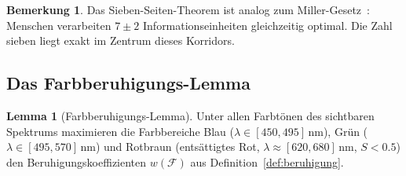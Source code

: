 ﻿\documentclass[a4paper,12pt]{article}
\theoremstyle{definition}
\newtheorem{lemma}{Lemma}
\newtheorem{bemerkung}{Bemerkung}
\begin{document}
\begin{bemerkung}
    Das Sieben-Seiten-Theorem ist analog zum Miller-Gesetz~\cite{miller1956}:
    Menschen verarbeiten $7 \pm 2$ Informationseinheiten gleichzeitig optimal.
    Die Zahl sieben liegt exakt im Zentrum dieses Korridors.
\end{bemerkung}

\subsection{Das Farbberuhigungs-Lemma}

\begin{lemma}[Farbberuhigungs-Lemma]
\label{lem:farbe}
    Unter allen Farbtönen des sichtbaren Spektrums maximieren die Farbbereiche
    Blau ($\lambda \in [450, 495]\,\text{nm}$), Grün
    ($\lambda \in [495, 570]\,\text{nm}$) und Rotbraun
    (entsättigtes Rot, $\lambda \approx [620, 680]\,\text{nm}$, $S < 0.5$)
    den Beruhigungskoeffizienten $w(\mathcal{F})$ aus Definition~\ref{def:beruhigung}.
\end{lemma}
\end{document}
